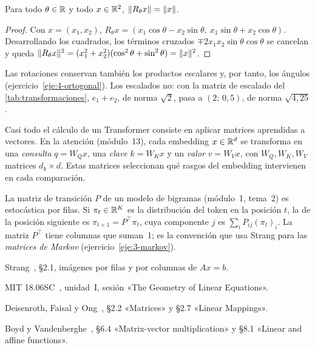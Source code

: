 \begin{proposicion}\label{prop:rotacion}
Para todo $\theta\in\mathbb{R}$ y todo $x\in\mathbb{R}^{2}$, $\lVert R_\theta x\rVert=\lVert x\rVert$.
\end{proposicion}

\begin{proof}
Con $x=(x_1,x_2)$, $R_\theta x=(x_1\cos\theta-x_2\sin\theta,\ x_1\sin\theta+x_2\cos\theta)$. Desarrollando los cuadrados, los términos cruzados $\mp 2x_1x_2\sin\theta\cos\theta$ se cancelan y queda
$\lVert R_\theta x\rVert^{2}=(x_1^{2}+x_2^{2})(\cos^{2}\theta+\sin^{2}\theta)=\lVert x\rVert^{2}$.
\end{proof}

Las rotaciones conservan también los productos escalares y, por tanto, los ángulos (ejercicio~\ref{eje:4-ortogonal}). Los escalados no: con la matriz de escalado del \cref{tab:transformaciones}, $e_1+e_2$, de norma $\sqrt2$, pasa a $(2;\,0{,}5)$, de norma $\sqrt{4{,}25}$.

\begin{observacion}\label{obs:qkv}
Casi todo el cálculo de un Transformer consiste en aplicar matrices aprendidas a vectores. En la atención (módulo~13), cada embedding $x\in\mathbb{R}^{d}$ se transforma en una \emph{consulta} $q=W_Qx$, una \emph{clave} $k=W_Kx$ y un \emph{valor} $v=W_Vx$, con $W_Q,W_K,W_V$ matrices $d_k\times d$. Estas matrices seleccionan qué rasgos del embedding intervienen en cada comparación.
\end{observacion}

\begin{observacion}
La matriz de transición $P$ de un modelo de bigramas (módulo~1, tema~2) es estocástica por filas. Si $\pi_t\in\mathbb{R}^{K}$ es la distribución del token en la posición $t$, la de la posición siguiente es $\pi_{t+1}=P^{\top}\pi_t$, cuya componente $j$ es $\sum_iP_{ij}(\pi_t)_i$. La matriz $P^{\top}$ tiene columnas que suman~1; es la convención que usa Strang para las \emph{matrices de Markov} (ejercicio~\ref{eje:3-markov}).
\end{observacion}

\begin{lecturas}
\item Strang~\cite{strang}, §2.1, imágenes por filas y por columnas de $Ax=b$.
\item MIT 18.06SC~\cite{mit1806sc}, unidad~I, sesión «The Geometry of Linear Equations».
\item Deisenroth, Faisal y Ong~\cite{mml}, §2.2 «Matrices» y §2.7 «Linear Mappings».
\item Boyd y Vandenberghe~\cite{vmls}, §6.4 «Matrix-vector multiplication» y §8.1 «Linear and affine functions».
\end{lecturas}


